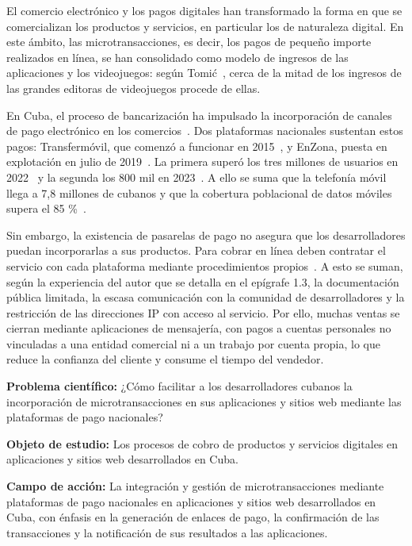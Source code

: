 \documentclass[12pt]{article}
\begin{document}
El comercio electrónico y los pagos digitales han transformado la forma en que se comercializan los productos y servicios, en particular los de naturaleza digital. En este ámbito, las microtransacciones, es decir, los pagos de pequeño importe realizados en línea, se han consolidado como modelo de ingresos de las aplicaciones y los videojuegos: según Tomić~\cite{tomic}, cerca de la mitad de los ingresos de las grandes editoras de videojuegos procede de ellas.

En Cuba, el proceso de bancarización ha impulsado la incorporación de canales de pago electrónico en los comercios~\cite{granma23}. Dos plataformas nacionales sustentan estos pagos: Transfermóvil, que comenzó a funcionar en 2015~\cite{etecsa}, y EnZona, puesta en explotación en julio de 2019~\cite{cubadebate21}. La primera superó los tres millones de usuarios en 2022~\cite{etecsa} y la segunda los 800 mil en 2023~\cite{mesa23b}. A ello se suma que la telefonía móvil llega a 7,8 millones de cubanos y que la cobertura poblacional de datos móviles supera el 85 \%~\cite{mesa23a}.

Sin embargo, la existencia de pasarelas de pago no asegura que los desarrolladores puedan incorporarlas a sus productos. Para cobrar en línea deben contratar el servicio con cada plataforma mediante procedimientos propios~\cite{granma23,oncuba23}. A esto se suman, según la experiencia del autor que se detalla en el epígrafe 1.3, la documentación pública limitada, la escasa comunicación con la comunidad de desarrolladores y la restricción de las direcciones IP con acceso al servicio. Por ello, muchas ventas se cierran mediante aplicaciones de mensajería, con pagos a cuentas personales no vinculadas a una entidad comercial ni a un trabajo por cuenta propia, lo que reduce la confianza del cliente y consume el tiempo del vendedor.

\textbf{Problema científico:} ¿Cómo facilitar a los desarrolladores cubanos la incorporación de microtransacciones en sus aplicaciones y sitios web mediante las plataformas de pago nacionales?

\textbf{Objeto de estudio:} Los procesos de cobro de productos y servicios digitales en aplicaciones y sitios web desarrollados en Cuba.

\textbf{Campo de acción:} La integración y gestión de microtransacciones mediante plataformas de pago nacionales en aplicaciones y sitios web desarrollados en Cuba, con énfasis en la generación de enlaces de pago, la confirmación de las transacciones y la notificación de sus resultados a las aplicaciones.
\end{document}
